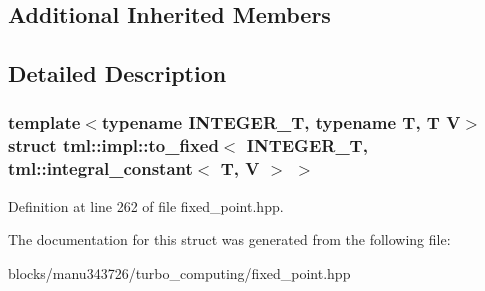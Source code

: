 \subsection*{Additional Inherited Members}


\subsection{Detailed Description}
\subsubsection*{template$<$typename I\+N\+T\+E\+G\+E\+R\+\_\+\+T, typename T, T V$>$struct tml\+::impl\+::to\+\_\+fixed$<$ I\+N\+T\+E\+G\+E\+R\+\_\+\+T, tml\+::integral\+\_\+constant$<$ T, V $>$ $>$}



Definition at line 262 of file fixed\+\_\+point.\+hpp.



The documentation for this struct was generated from the following file\+:\begin{DoxyCompactItemize}
\item 
blocks/manu343726/turbo\+\_\+computing/fixed\+\_\+point.\+hpp\end{DoxyCompactItemize}
